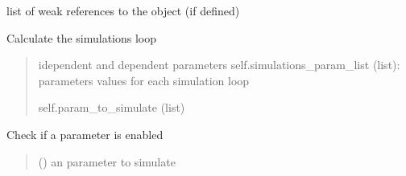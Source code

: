 \documentclass[letterpaper,10pt,english]{sphinxmanual}
\begin{document}
\begin{fulllineitems}
\begin{fulllineitems}
\end{fulllineitems}


\begin{fulllineitems}
\label{\detokenize{index:raypyng.simulate.SimulationParams.__weakref__}}
\pysigstartsignatures
{}
\pysigstopsignatures
\sphinxAtStartPar
list of weak references to the object (if defined)

\end{fulllineitems}


\begin{fulllineitems}
\label{\detokenize{index:raypyng.simulate.SimulationParams._calc_loop}}
\pysigstartsignatures
{}
\pysigstopsignatures
\sphinxAtStartPar
Calculate the simulations loop
\begin{quote}\begin{description}
\sphinxAtStartPar
idependent and dependent parameters
self.simulations\_param\_list (list): parameters values for each simulation loop

\sphinxAtStartPar
self.param\_to\_simulate (list)

\end{description}\end{quote}

\end{fulllineitems}


\begin{fulllineitems}
\label{\detokenize{index:raypyng.simulate.SimulationParams._check_if_enabled}}
\pysigstartsignatures
{}
\pysigstopsignatures
\sphinxAtStartPar
Check if a parameter is enabled
\begin{quote}\begin{description}
\sphinxAtStartPar
{} () \textendash{} an parameter to simulate


\end{description}
\end{quote}
\end{fulllineitems}
\end{fulllineitems}
\end{document}
